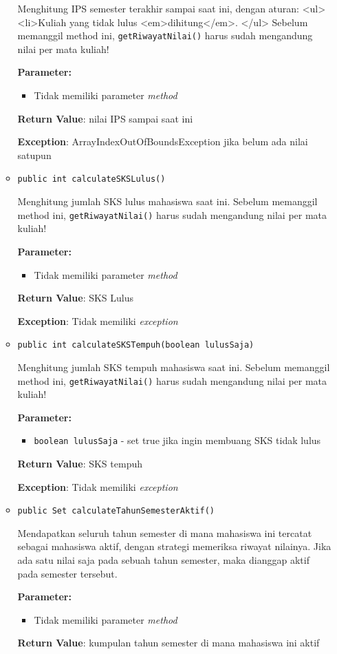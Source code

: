 \documentclass{article}
\begin{document}
\begin{enumerate}
\begin{itemize}
Menghitung IPS semester terakhir sampai saat ini, dengan aturan:
 <ul>
   <li>Kuliah yang tidak lulus <em>dihitung</em>.
 </ul>
 Sebelum memanggil method ini, \texttt{getRiwayatNilai()} harus sudah mengandung nilai per mata kuliah!

\textbf{Parameter:}
\begin{itemize}
\item Tidak memiliki parameter \textit{method}
\end{itemize}
\textbf{Return Value}: nilai IPS sampai saat ini

\textbf{Exception}: ArrayIndexOutOfBoundsException jika belum ada nilai satupun

\item \texttt{public int calculateSKSLulus()}

Menghitung jumlah SKS lulus mahasiswa saat ini.
 Sebelum memanggil method ini, \texttt{getRiwayatNilai()} harus sudah mengandung nilai per mata kuliah!

\textbf{Parameter:}
\begin{itemize}
\item Tidak memiliki parameter \textit{method}
\end{itemize}
\textbf{Return Value}: SKS Lulus

\textbf{Exception}: Tidak memiliki \textit{exception}

\item \texttt{public int calculateSKSTempuh(boolean lulusSaja)}

Menghitung jumlah SKS tempuh mahasiswa saat ini.
 Sebelum memanggil method ini, \texttt{getRiwayatNilai()} harus sudah mengandung nilai per mata kuliah!

\textbf{Parameter:}
\begin{itemize}
\item \texttt{boolean lulusSaja} - 
set true jika ingin membuang SKS tidak lulus
\end{itemize}
\textbf{Return Value}: SKS tempuh

\textbf{Exception}: Tidak memiliki \textit{exception}

\item \texttt{public Set calculateTahunSemesterAktif()}

Mendapatkan seluruh tahun semester di mana mahasiswa ini tercatat
 sebagai mahasiswa aktif, dengan strategi memeriksa riwayat nilainya.
 Jika ada satu nilai saja pada sebuah tahun semester, maka dianggap
 aktif pada semester tersebut.

\textbf{Parameter:}
\begin{itemize}
\item Tidak memiliki parameter \textit{method}
\end{itemize}
\textbf{Return Value}: kumpulan tahun semester di mana mahasiswa ini aktif


\end{itemize}
\end{enumerate}
\end{document}
